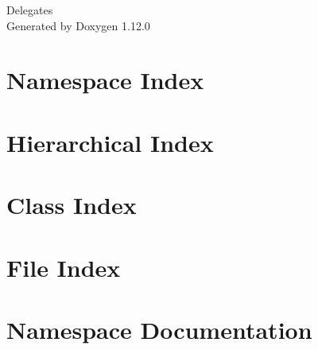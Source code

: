 \documentclass[twoside]{book}
\newcommand{\+}{\discretionary{\mbox{\scriptsize$\hookleftarrow$}}{}{}}
\newcommand{\clearemptydoublepage}{%
    \newpage{\pagestyle{empty}\cleardoublepage}%
  }
\begin{document}
  \raggedbottom
    \hypersetup{pageanchor=false,
                bookmarksnumbered=true,
                pdfencoding=unicode
               }
  \begin{titlepage}
  \vspace*{7cm}
  \begin{center}%
  {\Large Delegates}\\
  \vspace*{1cm}
  {\large Generated by Doxygen 1.12.0}\\
  \end{center}
  \end{titlepage}
  \clearemptydoublepage
  \tableofcontents
  \clearemptydoublepage
  \hypersetup{pageanchor=true}
\chapter{Namespace Index}

\chapter{Hierarchical Index}

\chapter{Class Index}

\chapter{File Index}

\chapter{Namespace Documentation}


\end{document}
